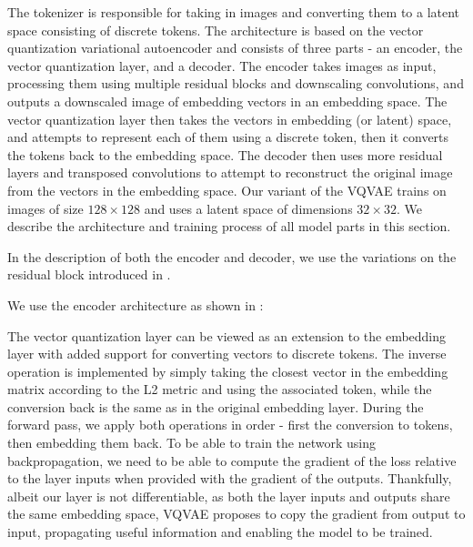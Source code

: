 The tokenizer is responsible for taking in images and converting them to a latent space consisting of discrete tokens. The architecture is based on the vector quantization variational autoencoder \citep{vqvae} and consists of three parts - an encoder, the vector quantization layer, and a decoder. The encoder takes images as input, processing them using multiple residual blocks and downscaling convolutions, and outputs a downscaled image of embedding vectors in an embedding space. The vector quantization layer then takes the vectors in embedding (or latent) space, and attempts to represent each of them using a discrete token, then it converts the tokens back to the embedding space. The decoder then uses more residual layers and transposed convolutions to attempt to reconstruct the original image from the vectors in the embedding space. Our variant of the VQVAE trains on images of size $128 \times 128$ and uses a latent space of dimensions $32 \times 32$. We describe the architecture and training process of all model parts in this section.

In the description of both the encoder and decoder, we use the variations on the residual block introduced in .


We use the encoder architecture as shown in :



The vector quantization layer can be viewed as an extension to the embedding layer with added support for converting vectors to discrete tokens. The inverse operation is implemented by simply taking the closest vector in the embedding matrix according to the L2 metric and using the associated token, while the conversion back is the same as in the original embedding layer. During the forward pass, we apply both operations in order - first the conversion to tokens, then embedding them back. To be able to train the network using backpropagation, we need to be able to compute the gradient of the loss relative to the layer inputs when provided with the gradient of the outputs. Thankfully, albeit our layer is not differentiable, as both the layer inputs and outputs share the same embedding space, VQVAE proposes to copy the gradient from output to input, propagating useful information and enabling the model to be trained.



